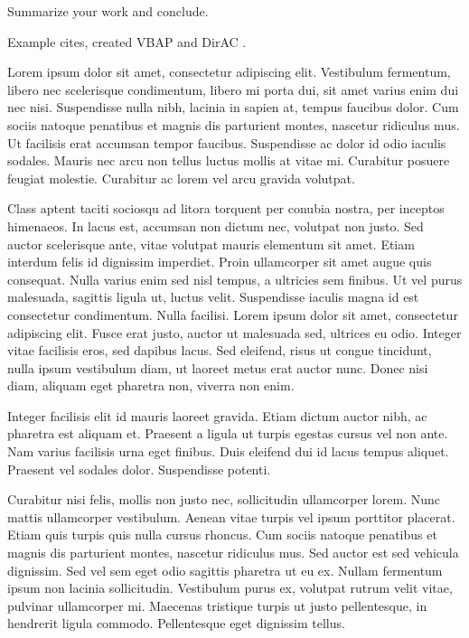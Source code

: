 \documentclass[convention]{aesconf}
\begin{document}
Summarize your work and conclude.

Example cites, \citet{Pulkki1997:VBAPbase} created VBAP and DirAC \citep{Pulkki2007:DirAC_JAES}.

Lorem ipsum dolor sit amet, consectetur adipiscing elit. Vestibulum fermentum, libero nec scelerisque condimentum, libero mi porta dui, sit amet varius enim dui nec nisi. Suspendisse nulla nibh, lacinia in sapien at, tempus faucibus dolor. Cum sociis natoque penatibus et magnis dis parturient montes, nascetur ridiculus mus. Ut facilisis erat accumsan tempor faucibus. Suspendisse ac dolor id odio iaculis sodales. Mauris nec arcu non tellus luctus mollis at vitae mi. Curabitur posuere feugiat molestie. Curabitur ac lorem vel arcu gravida volutpat.

Class aptent taciti sociosqu ad litora torquent per conubia nostra, per inceptos himenaeos. In lacus est, accumsan non dictum nec, volutpat non justo. Sed auctor scelerisque ante, vitae volutpat mauris elementum sit amet. Etiam interdum felis id dignissim imperdiet. Proin ullamcorper sit amet augue quis consequat. Nulla varius enim sed nisl tempus, a ultricies sem finibus. Ut vel purus malesuada, sagittis ligula ut, luctus velit. Suspendisse iaculis magna id est consectetur condimentum. Nulla facilisi. Lorem ipsum dolor sit amet, consectetur adipiscing elit. Fusce erat justo, auctor ut malesuada sed, ultrices eu odio. Integer vitae facilisis eros, sed dapibus lacus. Sed eleifend, risus ut congue tincidunt, nulla ipsum vestibulum diam, ut laoreet metus erat auctor nunc. Donec nisi diam, aliquam eget pharetra non, viverra non enim.

Integer facilisis elit id mauris laoreet gravida. Etiam dictum auctor nibh, ac pharetra est aliquam et. Praesent a ligula ut turpis egestas cursus vel non ante. Nam varius facilisis urna eget finibus. Duis eleifend dui id lacus tempus aliquet. Praesent vel sodales dolor. Suspendisse potenti.

Curabitur nisi felis, mollis non justo nec, sollicitudin ullamcorper lorem. Nunc mattis ullamcorper vestibulum. Aenean vitae turpis vel ipsum porttitor placerat. Etiam quis turpis quis nulla cursus rhoncus. Cum sociis natoque penatibus et magnis dis parturient montes, nascetur ridiculus mus. Sed auctor est sed vehicula dignissim. Sed vel sem eget odio sagittis pharetra ut eu ex. Nullam fermentum ipsum non lacinia sollicitudin. Vestibulum purus ex, volutpat rutrum velit vitae, pulvinar ullamcorper mi. Maecenas tristique turpis ut justo pellentesque, in hendrerit ligula commodo. Pellentesque eget dignissim tellus.





\end{document}
